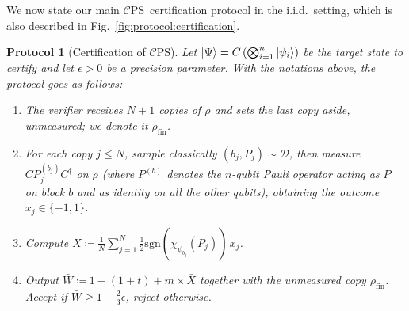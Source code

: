 \documentclass[a4paper,twocolumn,11pt,unpublished]{quantumarticle}
\newtheorem{protocol}{Protocol}
\newcommand{\np}{m}
\newcommand{\CEPS}{$\mathcal C$PS}
\newcommand{\pdist}{\mathcal D} %
\newcommand{\copyindex}{j}
\newcommand{\qubit}{i}
\begin{document}
 
            We now state our main \CEPS\ certification protocol in the i.i.d.\ setting, which is also described in Fig.~\ref{fig:protocol:certification}.


        


        \begin{protocol}[Certification of \CEPS]
            \label{protocol:certification}
            Let $\ket\Psi = C\left(\bigotimes_{\qubit=1}^n\ket{\psi_\qubit}\right)$ be the target state to certify and let $\epsilon>0$ be a precision parameter. With the notations above, the protocol goes as follows:
            \begin{enumerate}
                \item The verifier receives $N+1$ copies of $\rho$ and sets the last copy aside, unmeasured; we denote it $\rho_{\mathrm{fin}}$.
                \item For each copy $\copyindex\leq N$, sample classically $(b_j, P_j)\sim \pdist$, then measure $C P_j^{(b_j)} C^\dagger$ on $\rho$ (where $P^{(b)}$ denotes the $n$-qubit Pauli operator acting as $P$ on block $b$ and as identity on all the other qubits), obtaining the outcome $x_j\in\{-1, 1\}$.
                \item Compute $\bar X \coloneqq \frac{1}{N}\sum_{\copyindex=1}^N \tfrac 1 2 \mathrm{sgn}(\chi_{\psi_{b_j}}(P_j)) \,x_j$.
                \item Output $\bar W\coloneqq 1-(1+t)+\np\times \bar X$ together with the unmeasured copy $\rho_{\mathrm{fin}}$. Accept if $\bar W\ge1-\frac23\epsilon$, reject otherwise.
            \end{enumerate}
        \end{protocol}
\end{document}
